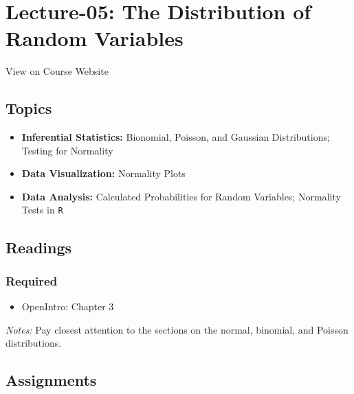 \documentclass[]{book}
\providecommand{\tightlist}{%
  \setlength{\itemsep}{0pt}\setlength{\parskip}{0pt}}
\theoremstyle{definition}
\theoremstyle{definition}
\theoremstyle{definition}
\theoremstyle{remark}
\begin{document}
\hypertarget{lecture-05-the-distribution-of-random-variables}{%
\section*{Lecture-05: The Distribution of Random
Variables}\label{lecture-05-the-distribution-of-random-variables}}

View on Course Website

\hypertarget{topics-5}{%
\subsection*{Topics}\label{topics-5}}

\begin{itemize}
\tightlist
\item
  \textbf{Inferential Statistics:} Bionomial, Poisson, and Gaussian
  Distributions; Testing for Normality
\item
  \textbf{Data Visualization:} Normality Plots
\item
  \textbf{Data Analysis:} Calculated Probabilities for Random Variables;
  Normality Tests in \texttt{R}
\end{itemize}

\hypertarget{readings-6}{%
\subsection*{Readings}\label{readings-6}}

\hypertarget{required-6}{%
\subsubsection*{Required}\label{required-6}}

\begin{itemize}
\tightlist
\item
  OpenIntro: Chapter 3
\end{itemize}

\emph{Notes:} Pay closest attention to the sections on the normal,
binomial, and Poisson distributions.

\hypertarget{assignments-6}{%
\subsection*{Assignments}\label{assignments-6}}
\end{document}
